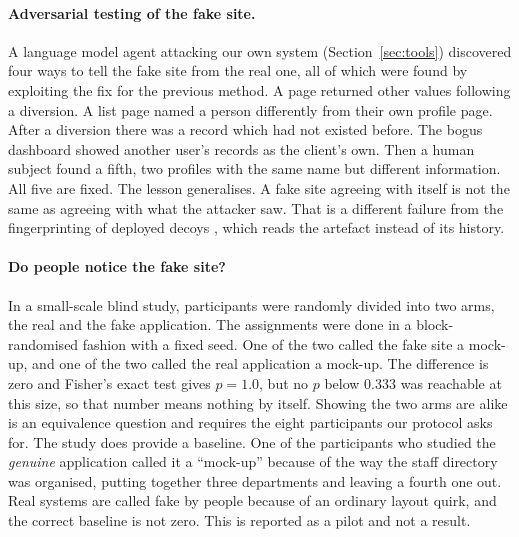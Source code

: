 \documentclass[runningheads]{llncs}
\begin{document}
\paragraph{Adversarial testing of the fake site.} A language model agent attacking our own system (Section~\ref{sec:tools}) discovered four ways to tell the fake site from the real one, all of which were found by exploiting the fix for the previous method. A page returned other values following a diversion. A list page named a person differently from their own profile page. After a diversion there was a record which had not existed before. The bogus dashboard showed another user's records as the client's own. Then a human subject found a fifth, two profiles with the same name but different information. All five are fixed. The lesson generalises. A fake site agreeing with  itself is not the same as agreeing with what the attacker saw. That is a different failure from the fingerprinting of deployed decoys \cite{srinivasa2020honeytoken,vetterl2018bitter}, which reads the artefact instead of
its history.

\paragraph{Do people notice the fake site?} In a small-scale blind study, participants were randomly divided into two arms, the real and the fake application. The assignments were done in a block-randomised fashion with a fixed seed. One of the two called the fake site a mock-up, and one of the two called the real application a mock-up. The difference is zero and Fisher's exact test gives $p = 1.0$, but no $p$ below $0.333$ was reachable at this size, so that number means nothing by itself. Showing the two arms are alike is an equivalence question \cite{schuirmann1987comparison} and requires the eight participants our protocol asks for. The study does provide a baseline. One of the participants who studied the \emph{genuine} application called it a ``mock-up'' because of the way the staff directory was organised, putting together three departments and leaving a fourth one out. Real systems are called fake by people because of an ordinary layout quirk, and the correct baseline is not zero. This is reported as a pilot and not a result.
\end{document}
